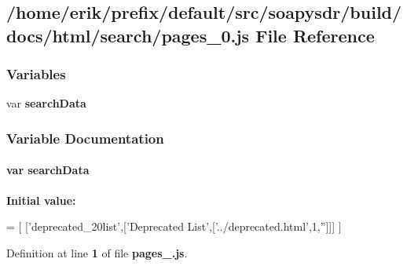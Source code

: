 \subsection{/home/erik/prefix/default/src/soapysdr/build/docs/html/search/pages\+\_\+0.js File Reference}
\label{pages__0_8js}
\subsubsection*{Variables}
\begin{DoxyCompactItemize}
\item 
var {\bf search\+Data}
\end{DoxyCompactItemize}


\subsubsection{Variable Documentation}
\paragraph[{search\+Data}]{\setlength{\rightskip}{0pt plus 5cm}var search\+Data}\label{pages__0_8js_ad01a7523f103d6242ef9b0451861231e}
{\bfseries Initial value\+:}
\begin{DoxyCode}
=
[
  [\textcolor{stringliteral}{'deprecated\_20list'},[\textcolor{stringliteral}{'Deprecated List'},[\textcolor{stringliteral}{'../deprecated.html'},1,\textcolor{stringliteral}{''}]]]
]
\end{DoxyCode}


Definition at line {\bf 1} of file {\bf pages\+\_.\+js}.

